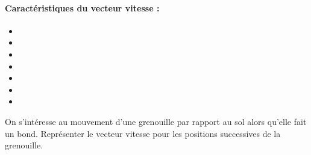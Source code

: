 \documentclass[12pt,a4paper]{article}
\begin{document}
\begin{center}
\end{center}

\paragraph{Caractéristiques du vecteur vitesse :}
\begin{itemize}
\item[\phantom{•}]
\item[\phantom{•}]
\item[\phantom{•}]
\item[\phantom{•}]
\item[\phantom{•}]
\item[\phantom{•}]
\item[\phantom{•}]
\end{itemize}

\begin{em}
On s'intéresse au mouvement d'une grenouille par rapport au sol alors qu'elle fait un bond.
Représenter le vecteur vitesse pour les positions successives de la grenouille.
\end{em}
\end{document}
